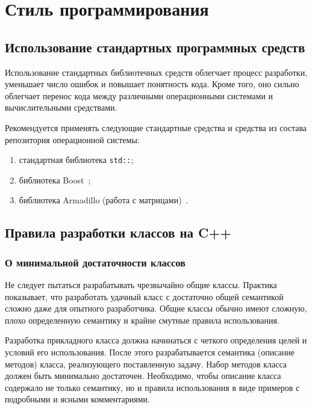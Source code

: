 \newpage
\section{Стиль программирования}

\subsection{Использование стандартных программных средств}

Использование стандартных библиотечных средств облегчает процесс разработки, уменьшает число ошибок и повышает понятность кода. Кроме того, оно сильно облегчает перенос кода между различными операционными системами и вычислительными средствами. 

Рекомендуется применять следующие стандартные средства и средства из состава репозитория операционной системы:

\begin{enumerate}
\item стандартная библиотека \lstinline|std::|;
\item библиотека Boost~\cite{Boost};
\item библиотека Armadillo (работа с матрицами)~\cite{Armadillo}.
\end{enumerate}

\subsection{Правила разработки классов на C++}

\subsubsection{О минимальной достаточности классов}

Не следует пытаться разрабатывать чрезвычайно общие классы. Практика показывает, что разработать удачный класс с достаточно общей семантикой сложно даже для опытного разработчика. Общие классы обычно имеют сложную, плохо определенную семантику и крайне смутные правила использования.

Разработка прикладного класса должна начинаться с четкого определения целей и условий его использования. После этого разрабатывается семантика (описание методов) класса, реализующего поставленную задачу. Набор методов класса должен быть минимально достаточен. Необходимо, чтобы описание класса содержало не только семантику, но и правила использования в виде примеров с подробными и ясными комментариями.

